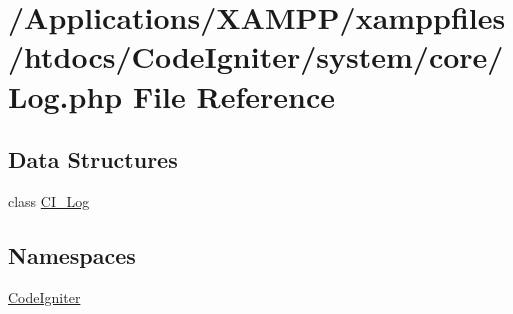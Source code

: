 \hypertarget{_log_8php}{}\section{/\+Applications/\+X\+A\+M\+P\+P/xamppfiles/htdocs/\+Code\+Igniter/system/core/\+Log.php File Reference}
\label{_log_8php}
\subsection*{Data Structures}
\begin{DoxyCompactItemize}
\item 
class \mbox{\hyperlink{class_c_i___log}{C\+I\+\_\+\+Log}}
\end{DoxyCompactItemize}
\subsection*{Namespaces}
\begin{DoxyCompactItemize}
\item 
 \mbox{\hyperlink{namespace_code_igniter}{Code\+Igniter}}
\end{DoxyCompactItemize}
